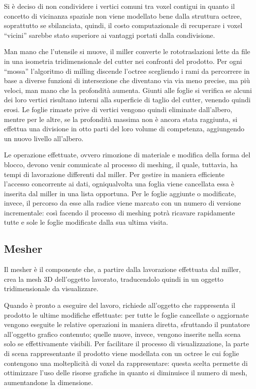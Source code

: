 \documentclass[10pt,a4paper,twoside,openright,titlepage,fleqn,%
               headinclude,,footinclude,BCOR5mm,%
               numbers=noenddot,cleardoublepage=empty,%
               tablecaptionabove]{scrreprt}
\begin{document}
Si è deciso di non condividere i vertici comuni tra voxel contigui in quanto il concetto di vicinanza spaziale non viene modellato bene dalla struttura octree, soprattutto se sbilanciata, quindi, il costo computazionale di recuperare i voxel ``vicini'' sarebbe stato superiore ai vantaggi portati dalla condivisione.

Man mano che l'utensile si muove, il miller converte le rototraslazioni lette da file in una isometria tridimensionale del cutter nei confronti del prodotto. Per ogni ``mossa'' l’algoritmo di milling discende l’octree scegliendo i rami da percorrere in base a diverse funzioni di intersezione che diventano via via meno precise, ma più veloci, man mano che la profondità aumenta. Giunti alle foglie si verifica se alcuni dei loro vertici risultano interni alla superficie di taglio del cutter, venendo quindi erosi. Le foglie rimaste prive di vertici vengono quindi eliminate dall’albero, mentre per le altre, se la profondità massima non è ancora stata raggiunta, si effettua una divisione in otto parti del loro volume di competenza, aggiungendo un nuovo livello all’albero.

Le operazione effettuate, ovvero rimozione di materiale e modifica della forma del blocco, devono venir comunicate al processo di meshing, il quale, tuttavia, ha tempi di lavorazione differenti dal miller. Per gestire in maniera efficiente l'accesso concorrente ai dati, ogniqualvolta una foglia viene cancellata essa è inserita dal miller in una lista opportuna. Per le foglie aggiunte o modificate, invece, il percorso da esse alla radice viene marcato con un numero di versione incrementale: così facendo il processo di meshing potrà ricavare rapidamente tutte e sole le foglie modificate dalla sua ultima visita.

\subsection{Mesher}
Il mesher è il componente che, a partire dalla lavorazione effettuata dal miller, crea la mesh 3D dell'oggetto lavorato, traducendolo quindi in un oggetto tridimensionale da visualizzare.

Quando è pronto a eseguire del lavoro, richiede all’oggetto che rappresenta il prodotto le ultime modifiche effettuate: per tutte le foglie cancellate o aggiornate vengono eseguite le relative operazioni in maniera diretta, sfruttando il puntatore all’oggetto grafico contenuto;  quelle nuove, invece, vengono inserite nella scena solo se effettivamente visibili. Per facilitare il processo di visualizzazione, la parte di scena rappresentante il prodotto viene modellata con un octree le cui foglie contengono una molteplicità di voxel da rappresentare: questa scelta permette di ottimizzare l’uso delle risorse grafiche in quanto si diminuisce il numero di mesh, aumentandone la dimensione.
\end{document}
